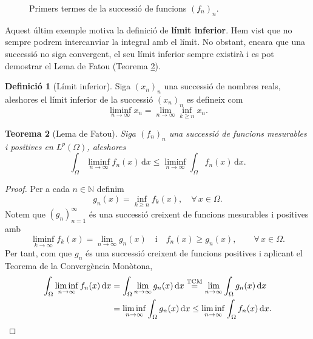\documentclass[12pt]{book}
\newtheorem{teorema}{Teorema}[chapter]
\theoremstyle{definition}
\newtheorem{defi}[teorema]{Definició}
\theoremstyle{nota}
\theoremstyle{exemple}
\begin{document}
\begin{figure}[htbp]
  \caption{Primers termes de la successió de funcions $(f_n)_n$.}
  \label{fig:exemple-no-conver}
\end{figure}

Aquest últim exemple motiva la definició de \textbf{límit
  inferior}. Hem vist que no sempre podrem intercanviar la integral
amb el límit. No obstant, encara que una successió no siga convergent,
el seu límit inferior sempre existirà i es pot demostrar el Lema de Fatou (Teorema \ref{teo:fatou}).

\begin{defi}[Límit inferior]
  Siga $(x_n)_n$ una successió de nombres reals, aleshores el límit
  inferior de la successió $(x_n)_n$ es defineix com
  \[
    \liminf_{n \to \infty} x_n = \lim_{n \to \infty} \inf_{k \geq n} x_n.
  \]
\end{defi}

\begin{teorema}[Lema de Fatou]\label{teo:fatou}
  Siga $(f_n)_n$ una successió de funcions mesurables i positives en
  $L^p(\Omega)$, aleshores
  \[
    \int_{\Omega} \liminf_{n \to \infty} f_n(x) \, \mathrm{d}x \leq
    \liminf_{n \to \infty} \int_{\Omega} f_n(x) \, \mathrm{d}x.
  \]
\end{teorema}

\begin{proof}
  Per a cada $n \in \mathbb{N}$ definim
  \[
    g_n(x) = \inf_{k \geq n} f_k(x), \quad \forall\, x \in \Omega.
  \]
  Notem que $(g_n)_{n=1}^\infty$ és una successió creixent de funcions
  mesurables i positives amb
  \[
    \liminf_{k \to \infty} f_k(x) = \lim_{n \to \infty} g_n(x) \quad
    \text{i} \quad f_n(x) \geq g_n(x), \qquad \forall\, x \in \Omega.
  \]
  Per tant, com que $g_n$ és una successió creixent de funcions
  positives i aplicant el Teorema de la Convergència Monòtona,
  \begin{align*}
    \int_\Omega \liminf_{n \to \infty} f_n(x)\, \mathrm{d}x
    &= \int_\Omega \lim_{n \to \infty} g_n(x)\, \mathrm{d}x
      \overset{\text{TCM}}{=}
      \lim_{n \to \infty} \int_\Omega g_n(x)\, \mathrm{d}x \\
    &= \liminf_{n \to \infty} \int_\Omega g_n(x)\, \mathrm{d}x
      \leq \liminf_{n \to \infty} \int_\Omega f_n(x)\, \mathrm{d}x.
      \qedhere
  \end{align*}
\end{proof}
\end{document}
